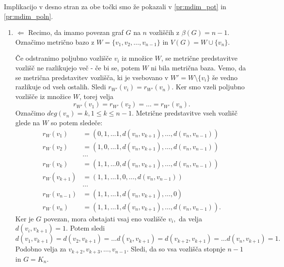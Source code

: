 \documentclass[mat1, tisk]{fmfdelo}
\newcommand{\1}{(1, 1, \ldots, 1)}
\newcommand{\2}{(2, 2, \ldots, 2)}
\begin{document}
\begin{dokaz}
    Implikacijo v desno stran za obe točki smo že pokazali v \ref{pr:mdim_pot} in 
    \ref{pr:mdim_poln}.
    \begin{enumerate}
        \item $\Leftarrow$ 
        Recimo, da imamo povezan graf $G$ na $n$ vozliščih z $\beta(G) = n - 1.$ Označimo metrično bazo
        z $W = \{v_1, v_2, \ldots, v_{n-1}\}$ in $V(G) = W \cup \{v_n\}$. 
        
        Če odstranimo poljubno vozlišče $v_i$ iz množice $W$, se metrične predstavitve vozlišč ne razlikujejo
        več - če bi se, potem $W$ ni bila metrična baza. Vemo, da se metrična predstavitev vozlišča, ki 
        je vsebovano v $W' = W \setminus \{v_i \}$ še vedno razlikuje od vseh ostalih. Sledi $r_{W'}(v_i) = r_{W'}(v_n)$.
        Ker smo vzeli poljubno vozlišče iz množice $W$, torej velja $$r_{W'}(v_1) = r_{W'}(v_2) = \ldots = r_{W'}(v_n).$$
        Označimo $deg(v_n) = k, 1 \leq k \leq n-1$. Metrične predstavitve vseh vozlišč glede na $W$ so potem sledeče:
        \begin{align*}
            r_W(v_1) & = (0, 1, \ldots 1, d(v_n, v_{k+1}), \ldots,d(v_n, v_{n-1})) \\
            r_W(v_2) & = (1, 0, \ldots 1, d(v_n, v_{k+1}), \ldots,d(v_n, v_{n-1}))\\
            & \dots \\
            r_W(v_k)  & = (1, 1, \ldots 0, d(v_n, v_{k+1}), \ldots,d(v_n, v_{n-1}))\\
            r_W(v_{k+1}) & = (1, 1, \ldots 1, 0, \ldots,d(v_n, v_{n-1})) \\
            & \dots \\
            r_W(v_{n - 1}) & = (1, 1, \ldots 1, d(v_n, v_{k+1}), \ldots, 0) \\
            r_W(v_n)  & = (1, 1, \ldots 1, d(v_n, v_{k+1}), \ldots,d(v_n, v_{n-1})).
        \end{align*}
        Ker je $G$ povezan, mora obstajati vsaj eno vozlišče $v_i,$ da velja $d(v_i, v_{k+1}) = 1.$ Potem sledi
        $$d(v_1, v_{k+1}) = d(v_2, v_{k+1}) = \ldots d(v_k, v_{k+1}) = d(v_{k+2}, v_{k+1}) = \ldots d(v_n, v_{k+1}) = 1.$$
        Podobno velja za $v_{k+2}, v_{k+3}, \ldots, v_{n-1}.$ Sledi, da so vsa vozlišča stopnje $n-1$ in $G = K_n.$
        

\end{enumerate}
\end{dokaz}
\end{document}
